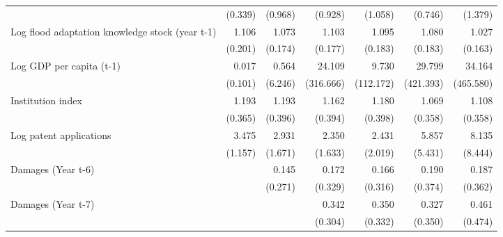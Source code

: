 \begin{table}[htbp]
\begin{tabular}{l*{6}{D{.}{.}{-1}}}
                    &     (0.339)         &     (0.968)         &     (0.928)         &     (1.058)         &     (0.746)         &     (1.379)         \\
\addlinespace
Log flood adaptation knowledge stock (year t-1)&       1.106         &       1.073         &       1.103         &       1.095         &       1.080         &       1.027         \\
                    &     (0.201)         &     (0.174)         &     (0.177)         &     (0.183)         &     (0.183)         &     (0.163)         \\
\addlinespace
Log GDP per capita (t-1)&       0.017         &       0.564         &      24.109         &       9.730         &      29.799         &      34.164         \\
                    &     (0.101)         &     (6.246)         &   (316.666)         &   (112.172)         &   (421.393)         &   (465.580)         \\
\addlinespace
Institution index   &       1.193         &       1.193         &       1.162         &       1.180         &       1.069         &       1.108         \\
                    &     (0.365)         &     (0.396)         &     (0.394)         &     (0.398)         &     (0.358)         &     (0.358)         \\
\addlinespace
Log patent applications&       3.475\sym{***}&       2.931\sym{*}  &       2.350         &       2.431         &       5.857\sym{*}  &       8.135\sym{**} \\
                    &     (1.157)         &     (1.671)         &     (1.633)         &     (2.019)         &     (5.431)         &     (8.444)         \\
\addlinespace
Damages (Year t-6)  &                     &       0.145         &       0.172         &       0.166         &       0.190         &       0.187         \\
                    &                     &     (0.271)         &     (0.329)         &     (0.316)         &     (0.374)         &     (0.362)         \\
\addlinespace
Damages (Year t-7)  &                     &                     &       0.342         &       0.350         &       0.327         &       0.461         \\
                    &                     &                     &     (0.304)         &     (0.332)         &     (0.350)         &     (0.474)         \\

\end{tabular}
\end{table}
